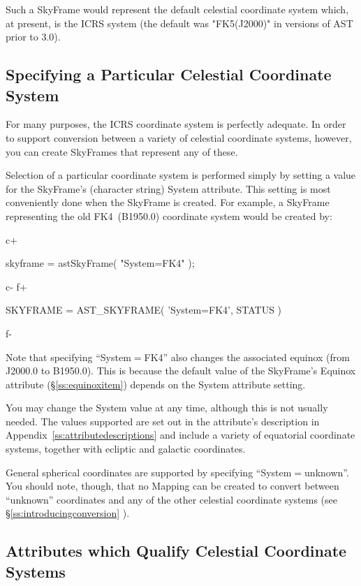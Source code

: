\documentclass[twoside,11pt]{starlink}
\providecommand{\appref}[1]{Appendix~\ref{#1}}
\providecommand{\secref}[1]{\S\ref{#1}}
\begin{document}
Such a SkyFrame would represent the default celestial coordinate
system which, at present, is the ICRS system (the default was "FK5(J2000)"
in versions of AST prior to 3.0).

\subsection{Specifying a Particular Celestial Coordinate System}

For many purposes, the ICRS coordinate system is perfectly
adequate. In order to support conversion between a variety of
celestial coordinate systems, however, you can create SkyFrames that
represent any of these.

Selection of a particular coordinate system is performed simply by
setting a value for the SkyFrame's (character string) System
attribute. This setting is most conveniently done when the SkyFrame is
created. For example, a SkyFrame representing the old FK4~(B1950.0)
coordinate system would be created by:

c+
\small
\begin{terminalv}
skyframe = astSkyFrame( "System=FK4" );
\end{terminalv}
\normalsize
c-
f+
\small
\begin{terminalv}
      SKYFRAME = AST_SKYFRAME( 'System=FK4', STATUS )
\end{terminalv}
\normalsize
f-

Note that specifying ``System$=$FK4'' also changes the associated
equinox (from J2000.0 to B1950.0). This is because the default value
of the SkyFrame's Equinox attribute (\secref{ss:equinoxitem}) depends
on the System attribute setting.

You may change the System value at any time, although this is not
usually needed.  The values supported are set out in the attribute's
description in \appref{ss:attributedescriptions} and include a variety
of equatorial coordinate systems, together with ecliptic and galactic
coordinates.

General spherical coordinates are supported by specifying
``System$=$unknown''. You should note, though, that no Mapping can be
created to convert between ``unknown'' coordinates and any of the other
celestial coordinate systems (see \secref{ss:introducingconversion} ).

\subsection{Attributes which Qualify Celestial Coordinate Systems}
\end{document}
